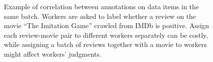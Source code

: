\begin{figure}[!t]
{\begin{tabular}{@{}c@{}}
    \end{tabular}
  }
  \caption{\label{fig:example}
  Example of correlation between annotations on data items in the same batch.
  Workers are asked to label whether a review on the movie ``The Imitation Game'' crawled from IMDb is positive.
  Assign each review-movie pair to different workers separately can be costly,
  while assigning a batch of reviews together with a movie to workers might affect workers' judgments.
  }
  \vspace{-0.15in}
\end{figure}




